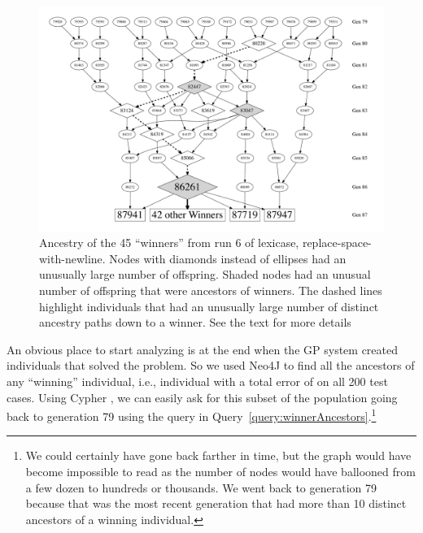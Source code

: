 \begin{figure}
	\vspace{0.6\columnwidth}
	\includegraphics[width=0.88\columnwidth]{figures/ancestors_of_winners.pdf}
	\caption{Ancestry of the 45 ``winners'' from run 6 of lexicase, replace-space-with-newline. Nodes
		with diamonds instead of ellipses had an unusually large number of offspring. Shaded nodes
		had an unusual number of offspring that were ancestors of winners. The dashed lines highlight
		individuals that had an unusually large number of distinct ancestry paths down to a winner.
		See the text for more details}
	\label{fig:winnerAncestors}
\end{figure}

An obvious place to start analyzing is at the end when the GP system created individuals that solved the problem. So we used Neo4J to find all the ancestors of any ``winning'' individual, i.e., individual with a total error of 
on all 200 test cases. Using Cypher%
, we can easily ask for this subset
of the population going back to generation 79 using the query in 
Query~\ref{query:winnerAncestors}.\footnote{We could certainly 
	have gone back farther in time, but the graph would have become impossible to read as the
	number of nodes would have ballooned from a few dozen to hundreds or thousands. We went
	back to generation 79 because that was the most recent generation that had more than 10
	distinct ancestors of a winning individual.}

